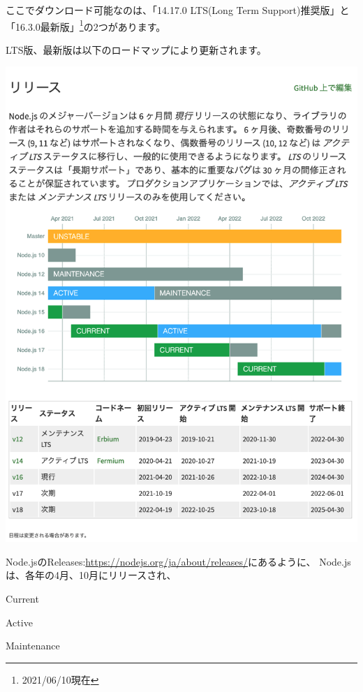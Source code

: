 ここでダウンロード可能なのは、「14.17.0 LTS(Long Term Support)推奨版」と「16.3.0最新版」\footnote{2021/06/10現在}の2つがあります。

LTS版、最新版は以下のロードマップにより更新されます。

\begin{reviewimage}[H]%
\includegraphics[width=1.0\maxwidth]{./images/01-createDevEnv/01_02nodejsRoadmap.png}%
\label{image:01-createDevEnv:01_02nodejsRoadmap}
\end{reviewimage}

\clearpage


Node.jsのReleases:\url{https://nodejs.org/ja/about/releases/}にあるように、
Node.jsは、各年の4月、10月にリリースされ、\\[0pt]

\begin{starteritemize}
\item Current
\item Active
\item Maintenance
\end{starteritemize}

